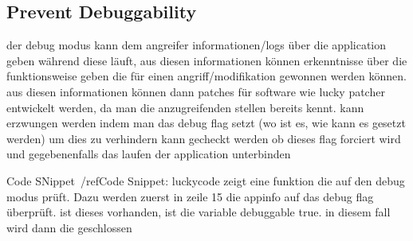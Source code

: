 \subsection{Prevent Debuggability}\label{subsection:subsection:counter-tampering-debuggable}
der debug modus kann dem angreifer informationen/logs über die application geben während diese läuft, aus diesen informationen können erkenntnisse über die funktionsweise geben die für einen angriff/modifikation gewonnen werden können. aus diesen informationen können dann patches für software wie lucky patcher entwickelt werden, da man die anzugreifenden stellen bereits kennt.
kann erzwungen werden indem man das debug flag setzt (wo ist es, wie kann es gesetzt werden)\newline
um dies zu verhindern kann gecheckt werden ob dieses flag forciert wird und gegebenenfalls das laufen der application unterbinden\newline



 Code SNippet~/ref{Code Snippet: luckycode} zeigt eine funktion die auf den debug modus prüft. Dazu werden zuerst in zeile 15 die appinfo auf das debug flag überprüft. ist dieses vorhanden, ist die variable debuggable true. in diesem fall wird dann die geschlossen\newline
